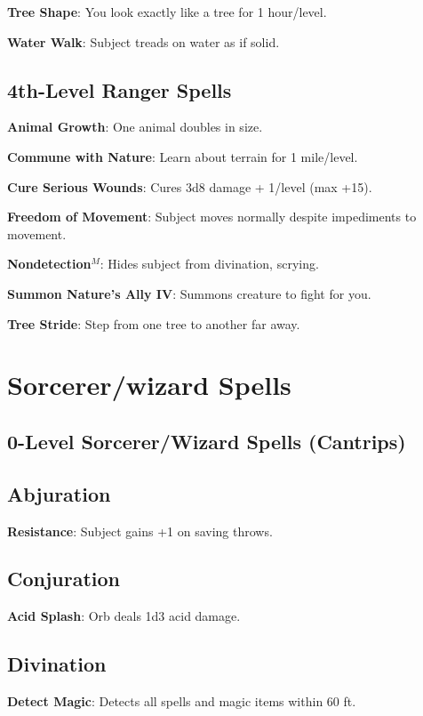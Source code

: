 \textbf{Tree Shape}: You look exactly like a tree for 1 hour/level.

\textbf{Water Walk}: Subject treads on water as if solid.

\subsection{4th-Level Ranger Spells}


\textbf{Animal Growth}: One animal doubles in size.

\textbf{Commune with Nature}: Learn about terrain for 1 mile/level.

\textbf{Cure Serious Wounds}: Cures 3d8 damage + 1/level (max +15).

\textbf{Freedom of Movement}: Subject moves normally despite impediments to movement.

\textbf{Nondetection}\(^{M}\): Hides subject from divination, scrying.

\textbf{Summon Nature's Ally IV}: Summons creature to fight for you.

\textbf{Tree Stride}: Step from one tree to another far away.

\section{Sorcerer/wizard Spells}


\subsection{0-Level Sorcerer/Wizard Spells (Cantrips)}


\subsection{Abjuration}


\textbf{Resistance}: Subject gains +1 on saving throws.

\subsection{Conjuration}


\textbf{Acid Splash}: Orb deals 1d3 acid damage.

\subsection{Divination}


\textbf{Detect Magic}: Detects all spells and magic items within 60 ft.

